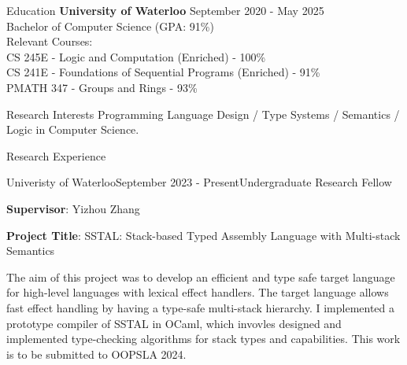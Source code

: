 \documentclass[
	12pt, %
]{resume} %
\begin{document}

\begin{rSection}{Education}
	\textbf{University of Waterloo} \hfill {September 2020 - May 2025} \\ 
	Bachelor of Computer Science (GPA: 91\%) \\
    Relevant Courses: \\
    \hspace*{5mm} CS 245E - Logic and Computation (Enriched) - 100\% \\
    \hspace*{5mm} CS 241E - Foundations of Sequential Programs (Enriched) - 91\% \\
    \hspace*{5mm} PMATH 347 - Groups and Rings - 93\% 
\end{rSection}

\begin{rSection}{Research Interests}
	Programming Language Design / Type Systems / Semantics / Logic in Computer Science.
\end{rSection}

\begin{rSection}{Research Experience}
	\begin{rSubsection}{Univeristy of Waterloo}{September 2023 - Present}{Undergraduate Research Fellow}{}
		\item \textbf{Supervisor}: Yizhou Zhang
		\item \textbf{Project Title}: SSTAL: Stack-based Typed Assembly Language with Multi-stack Semantics
		\item The aim of this project was to develop an efficient and type safe target language for high-level languages with lexical effect handlers.
		The target language allows fast effect handling by having a type-safe multi-stack hierarchy.
		I implemented a prototype compiler of SSTAL in OCaml, which invovles designed and implemented type-checking algorithms for stack types and capabilities.
		This work is to be submitted to OOPSLA 2024.
	\end{rSubsection}
\end{rSection}

\end{document}
